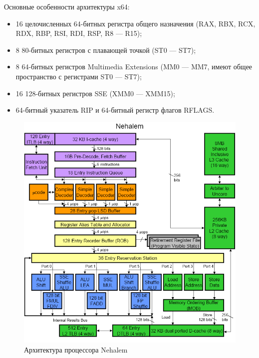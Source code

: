 \documentclass[12pt, a4paper, utf8]{article}
\begin{document}
Основные особенности архитектуры x64:
\begin{itemize}
\item 16 целочисленных 64-битных регистра общего назначения (RAX, RBX, RCX, RDX, RBP, RSI, RDI, RSP, R8 — R15);
\item 8 80-битных регистров с плавающей точкой (ST0 — ST7);
\item 8 64-битных регистров Multimedia Extensions (MM0 — MM7, имеют общее пространство с регистрами ST0 — ST7);
\item 16 128-битных регистров SSE (XMM0 — XMM15);
\item 64-битный указатель RIP и 64-битный регистр флагов RFLAGS.
\end{itemize}

\begin{figure}
\centering
\includegraphics[width=\textwidth]{imgs/nehalem.png}
\caption{Архитектура процессора Nehalem}\label{fig:arch_nehalem}
\end{figure}
\end{document}
